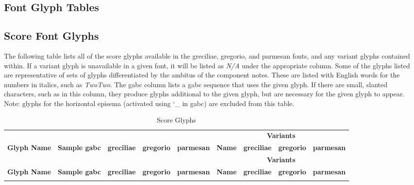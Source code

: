 \begin{landscape}

\section{Font Glyph Tables}\label{glyphtable}

\subsection{Score Font Glyphs}

The following table lists all of the score glyphs available in the greciliae,
gregorio, and parmesan fonts, and any variant glyphs contained within.  If a
variant glyph is unavailable in a given font, it will be listed as
{\itshape\small N/A} under the appropriate column.  Some of the glyphs listed
are representative of sets of glyphs differentiated by the ambitus of the
component notes.  These are listed with English words for the numbers in
italics, such as {\itshape TwoTwo}.  The gabc column lists a gabc sequence that
uses the given glyph.  If there are small, slanted characters, such as
 in this column, they produce glyphs additional to the given
glyph, but are necessary for the given glyph to appear.  Note: glyphs for the
horizontal episema (activated using {\ttfamily\char`_} in gabc) are excluded from
this table.

\newcommand\ScoreFontTable[1]{%
	\begin{longtable}{llccccccc}
			\caption{Score Glyphs}\\
			&&&&&\multicolumn{4}{c}{\bfseries Variants}\\
			\hhline{>{\arrayrulecolor{lightgray}}----->{\arrayrulecolor{black}}----}
			{\bfseries Glyph Name}&%
			{\scriptsize\bfseries Sample gabc}&%
			{\scriptsize\bfseries greciliae}&%
			{\scriptsize\bfseries gregorio}&%
			{\scriptsize\bfseries parmesan}&%
			{\scriptsize\bfseries Name}&%
			{\scriptsize\bfseries greciliae}&%
			{\scriptsize\bfseries gregorio}&%
			{\scriptsize\bfseries parmesan}\\
			\hline
		\endfirsthead
			&&&&&\multicolumn{4}{c}{\bfseries Variants}\\
			\hhline{>{\arrayrulecolor{lightgray}}----->{\arrayrulecolor{black}}----}
			{\bfseries Glyph Name}&%
			{\scriptsize\bfseries Sample gabc}&%
			{\scriptsize\bfseries greciliae}&%
			{\scriptsize\bfseries gregorio}&%
			{\scriptsize\bfseries parmesan}&%
			{\scriptsize\bfseries Name}&%
			{\scriptsize\bfseries greciliae}&%
			{\scriptsize\bfseries gregorio}&%
			{\scriptsize\bfseries parmesan}\\
			\hline
		\endhead
		\directlua{GregorioRef.emit_score_glyphs(#1)}
	\end{longtable}
}%
\ScoreFontTable{'greciliae','gregorio','parmesan'}


\end{landscape}
